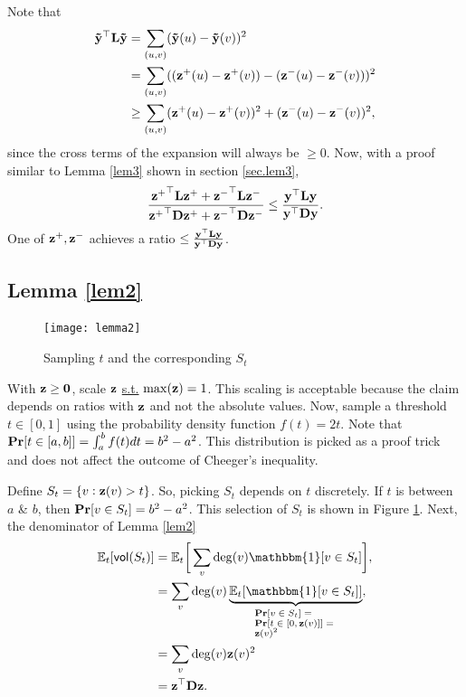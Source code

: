 \documentclass[11pt]{article}
\begin{document}
Note that
\begin{align*}
\V{\tilde{y}}^{\top}\V{L}\V{\tilde{y}} &= \sum_{(u,v)} (\V{\tilde{y}}(u) - \V{\tilde{y}}(v))^2 \\
&= \sum_{(u,v)} ( (\V{z^+}(u) - \V{z^+}(v)) - (\V{z^-}(u) - \V{z^-}(v)) )^2 \\
&\geq \sum_{(u,v)} (\V{z^+}(u) - \V{z^+}(v))^2 +  (\V{z^-}(u) - \V{z^-}(v))^2, \\
\end{align*}
since the cross terms of the expansion will always be $\geq 0$. Now, with a proof similar to Lemma \ref{lem3} shown in section \ref{sec.lem3}, 
\begin{equation*}
\dfrac{\V{z^+}^{\top}\V{L}\V{z^+}+\V{z^-}^{\top}\V{L}\V{z^-}}{\V{z^+}^{\top}\V{D}\V{z^+}+\V{z^-}^{\top}\V{D}\V{z^-}} \leq \dfrac{\V{y}^{\top}\V{L}\V{y}}{\V{y}^{\top}\V{D}\V{y}}.
\end{equation*}
One of $\V{z^+}, \V{z^-}$ achieves a ratio $\leq \frac{\V{y}^{\top}\V{L}\V{y}}{\V{y}^{\top}\V{D}\V{y}}$.

\subsection{Lemma \ref{lem2}}

\begin{figure}
\centering
\texttt{[image: lemma2]}
\caption{Sampling $t$ and the corresponding $S_t$}
\label{fig.lemma2}
\end{figure}

With $\V{z} \geq \V{0}$, scale $\V{z}$ \underline{s.t.} $\max(\V{z})=1$. This scaling is acceptable because the claim depends on ratios with $\V{z}$ and not the absolute values. Now, sample a threshold $t \in [0,1]$ using the probability density function $f(t) = 2t$. Note that $\operatorname*{\bf Pr}[t \in [a,b]] = \int_{a}^{b}f(t) dt = b^2 - a^2$. This distribution is picked as a proof trick and does not affect the outcome of Cheeger's inequality. 

Define $S_t = \{v:\V{z}(v)>t\}$. So, picking $S_t$ depends on $t$ discretely. If $t$ is between $a$ \& $b$, then $\operatorname*{\bf Pr}[v \in S_t] = b^2 - a^2$. This selection of $S_t$ is shown in Figure \ref{fig.lemma2}. Next, the denominator of Lemma \ref{lem2}
\begin{align*}
\mathbb{E}_t[\vol(S_t)] &= \mathbb{E}_t\bigg[\sum_v\mathrm{deg}(v)\mathbbm{1}[v\in S_t]\bigg], \\
&= \sum_v \mathrm{deg}(v) \underbrace{\mathbb{E}_t[\mathbbm{1}[v\in S_t]]}_{\parbox{6.5em}{\raggedright\scriptsize$\pr[v \in S_t] =\pr[t \in [0,\V{z}(v)]] =\V{z}(v)^2$}}, \\
&= \sum_v \mathrm{deg}(v) \V{z}(v)^2 \\
&= \V{z}^{\top}\V{D}\V{z}.
\end{align*}
\end{document}
